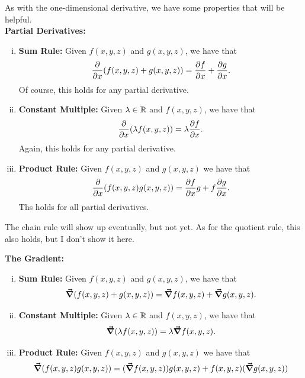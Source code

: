                         As with the one-dimensional derivative, we have some properties that will be helpful.\\
                        
                        \noindent\textbf{Partial Derivatives:}
                        \begin{enumerate}[(i)]
                            \item \textbf{Sum Rule:} Given $f(x,y,z)$ and $g(x,y,z)$, we have that
                            \[
                            \frac{\partial}{\partial x} (f(x,y,z)+g(x,y,z))=\frac{\partial f}{\partial x} + \frac{\partial g}{\partial x}.
                            \]
                            Of course, this holds for any partial derivative.
                            \item \textbf{Constant Multiple:} Given $\lambda \in \mathbb{R}$ and $f(x,y,z)$, we have that
                            \[
                            \frac{\partial}{\partial x}(\lambda f(x,y,z))=\lambda \frac{\partial f}{\partial x}.
                            \]
                            Again, this holds for any partial derivative.
                            \item \textbf{Product Rule:} Given $f(x,y,z)$ and $g(x,y,z)$ we have that
                            \[
                            \frac{\partial }{\partial x}(f(x,y,z)g(x,y,z))=\frac{\partial f}{\partial x} g + f \frac{\partial g}{\partial x}.
                            \]
                            Ths holds for all partial derivatives.
                        \end{enumerate}
                        
                        \begin{remark}
                        The chain rule will show up eventually, but not yet.  As for the quotient rule, this also holds, but I don't show it here.
                        \end{remark}
                        
                        \noindent\textbf{The Gradient:}
                        \begin{enumerate}[(i)]
                            \item \textbf{Sum Rule:} Given $f(x,y,z)$ and $g(x,y,z)$, we have that
                            \[
                            \boldsymbol{\vec{\nabla}}(f(x,y,z)+g(x,y,z))=\boldsymbol{\vec{\nabla}} f(x,y,z)+\boldsymbol{\vec{\nabla}} g(x,y,z).
                            \]
                            \item \textbf{Constant Multiple:} Given $\lambda \in \mathbb{R}$ and $f(x,y,z)$, we have that
                            \[
                            \boldsymbol{\vec{\nabla}}(\lambda f(x,y,z))=\lambda \boldsymbol{\vec{\nabla}} f(x,y,z).
                            \]
                            \item \textbf{Product Rule:} Given $f(x,y,z)$ and $g(x,y,z)$ we have that
                            \[
                            \boldsymbol{\vec{\nabla}}(f(x,y,z)g(x,y,z))=(\boldsymbol{\vec{\nabla}} f(x,y,z))g(x,y,z)+f(x,y,z)(\boldsymbol{\vec{\nabla}} g(x,y,z))
                            \]
                            
                        \end{enumerate}
                        
